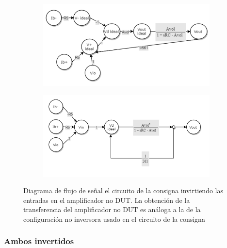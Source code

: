 \documentclass[../../main.tex]{subfiles}
\begin{document}
\begin{figure}[htpb]%
	\centering
	\begin{subfigure}[t]{0.49\textwidth}
		\centering
		\includegraphics[width=\textwidth]{imagenes/signal_flow_inv_noDUT.png}
		\caption{}
		\label{fig:ej_3_signal_flow_inv_noDUT_no_simplificado}
	\end{subfigure}%
	\hfill%
	\begin{subfigure}[t]{0.49\textwidth}
		\centering
		\includegraphics[width=\textwidth]{imagenes/signal_flow_inv_noDUT_simplificado.png}
		\caption{}
		\label{fig:ej_3_signal_flow_inv_noDUT_simplificado}
	\end{subfigure}
	\caption{Diagrama de flujo de se\~nal el circuito de la consigna invirtiendo las entradas en el amplificador no DUT. La obtenci\'on de la transferencia del amplificador no DUT es an\'aloga a la de la configuraci\'on no inversora usado en el circuito de la consigna}
	\label{fig:ej_3_signal_flow_inv_noDUT}	
\end{figure}




\subsubsection{Ambos invertidos}
\end{document}
